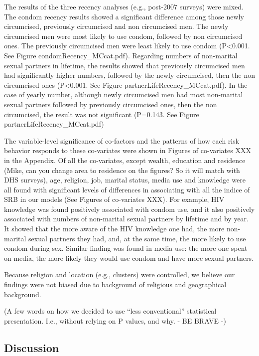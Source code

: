\documentclass[12pt,]{article}
\begin{document}
The results of the three recency analyses (e.g., post-2007 surveys) were
mixed. The condom recency results showed a significant difference among
those newly circumcised, previously circumcised and non circumcised men.
The newly circumcised men were most likely to use condom, followed by
non circumcised ones. The previously circumcised men were least likely
to use condom (P\textless{}0.001. See Figure condomRecency\_MCcat.pdf).
Regarding numbers of non-marital sexual partners in lifetime, the
results showed that previously circumcised men had significantly higher
numbers, followed by the newly circumcised, then the non circumcised
ones (P\textless{}0.001. See Figure partnerLifeRecency\_MCcat.pdf). In
the case of yearly number, although newly circumcised men had most
non-marital sexual partners followed by previously circumcised ones,
then the non circumcised, the result was not significant (P=0.143. See
Figure partnerLifeRecency\_MCcat.pdf)

The variable-level significance of co-factors and the patterns of how
each risk behavior responds to these co-variates were shown in Figures
of co-variates XXX in the Appendix. Of all the co-variates, except
wealth, education and residence (Mike, can you change area to residence
on the figures? So it will match with DHS surveys), age, religion, job,
marital status, media use and knowledge were all found with significant
levels of differences in associating with all the indice of SRB in our
models (See Figures of co-variates XXX). For example, HIV knowledge was
found positively associated with condom use, and it also positively
associated with numbers of non-marital sexual partners by lifetime and
by year. It showed that the more aware of the HIV knowledge one had, the
more non-marital sexual partners they had, and, at the same time, the
more likely to use condom during sex. Similar finding was found in media
use: the more one spent on media, the more likely they would use condom
and have more sexual partners.

Because religion and location (e.g., clusters) were controlled, we
believe our findings were not biased due to background of religious and
geographical background.

(A few words on how we decided to use ``less conventional'' statistical
presentation. I.e., without relying on P values, and why. - BE BRAVE -)

\subsection{Discussion}\label{discussion}
\end{document}
